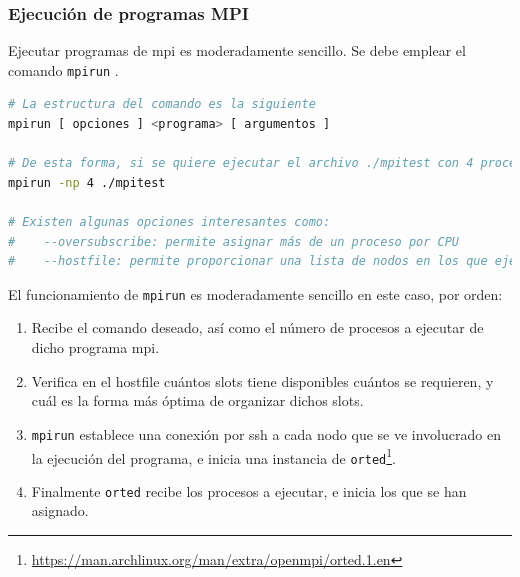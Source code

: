 \subsubsection{Ejecución de programas MPI}
\label{sssec:ejecucion_mpi}
Ejecutar programas de \acrshort{mpi} es moderadamente sencillo. Se debe emplear el comando \texttt{mpirun} \cite{mpi_mpirun}.

\begin{lstlisting}[language=bash]
# La estructura del comando es la siguiente
mpirun [ opciones ] <programa> [ argumentos ]

# De esta forma, si se quiere ejecutar el archivo ./mpitest con 4 procesos, se debe ejecutar
mpirun -np 4 ./mpitest

# Existen algunas opciones interesantes como:
#    --oversubscribe: permite asignar más de un proceso por CPU
#    --hostfile: permite proporcionar una lista de nodos en los que ejecutar el programa paralelo. Esto será especialmente útil en la ejecución de los benchmarks. (Aún así no es la única forma de ejecutar un programa en múltiples computadores, pero sí la que se usará en este trabajo) 
\end{lstlisting}

El funcionamiento de \texttt{mpirun} es moderadamente sencillo en este caso, por orden:
\begin{enumerate}
  \item Recibe el comando deseado, así como el número de procesos a ejecutar de dicho programa \acrshort{mpi}.
  \item Verifica en el hostfile cuántos slots tiene disponibles cuántos se requieren, y cuál es la forma más óptima de organizar dichos slots.
  \item \texttt{mpirun} establece una conexión por \acrshort{ssh} a cada nodo que se ve involucrado en la ejecución del programa, e inicia una instancia de \texttt{orted}\footnote{\url{https://man.archlinux.org/man/extra/openmpi/orted.1.en}}.
  \item Finalmente \texttt{orted} recibe los procesos a ejecutar, e inicia los que se han asignado.
\end{enumerate}